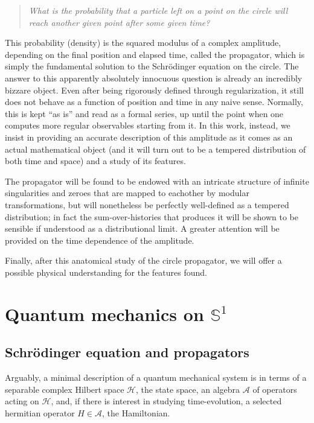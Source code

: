 \documentclass{article}
\newcommand{\ess}{\ensuremath{\mathbb{S}}}
\newcommand{\hil}{\ensuremath{\mathcal{H}}}
\begin{document}
\begin{quote} \emph{What is the probability that a particle left on a point on the circle will reach another given point after some given time?} \end{quote}

This probability (density) is the squared modulus of a complex amplitude, depending on the final position and elapsed time, called the propagator, which is simply the fundamental solution to the Schr\"odinger equation on the circle. The answer to this apparently absolutely innocuous question is already an incredibly bizzare object. Even after being rigorously defined through regularization, it still does not behave as a function of position and time in any naive sense. Normally, this is kept ``as is'' and read as a formal series, up until the point when one computes more regular observables starting from it. In this work, instead, we insist in providing an accurate description of this amplitude as it comes as an actual mathematical object (and it will turn out to be a tempered distribution of both time and space) and a study of its features.

The propagator will be found to be endowed with an intricate structure of infinite singularities and zeroes that are mapped to eachother by modular transformations, but will nonetheless be perfectly well-defined as a tempered distribution; in fact the sum-over-histories that produces it will be shown to be sensible if understood as a distributional limit. A greater attention will be provided on the time dependence of the amplitude.

Finally, after this anatomical study of the circle propagator, we will offer a possible physical understanding for the features found.

\section{Quantum mechanics on $\ess^1$}
\subsection{Schr\"odinger equation and propagators}

Arguably, a minimal description of a quantum mechanical system is in terms of a separable complex Hilbert space $\hil$, the state space, an algebra $\mathcal{A}$ of operators acting on $\hil$, and, if there is interest in studying time-evolution, a selected hermitian operator $H \in \mathcal{A}$, the Hamiltonian.  
\end{document}
